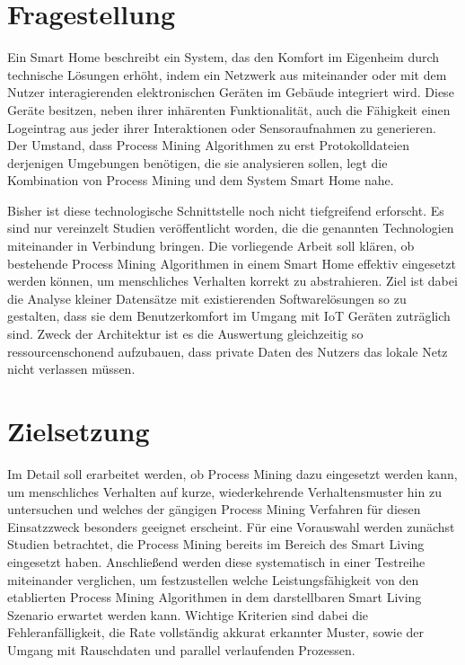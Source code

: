 \section{Fragestellung}
Ein Smart Home beschreibt ein System, das den Komfort im Eigenheim durch technische Lösungen erhöht, indem ein Netzwerk aus miteinander oder mit dem Nutzer interagierenden elektronischen Geräten im Gebäude integriert wird. Diese Geräte besitzen, neben ihrer inhärenten Funktionalität, auch die Fähigkeit einen Logeintrag aus jeder ihrer Interaktionen oder Sensoraufnahmen zu generieren. Der Umstand, dass Process Mining Algorithmen zu erst Protokolldateien derjenigen Umgebungen benötigen, die sie analysieren sollen, legt die Kombination von Process Mining und dem System Smart Home nahe.
 
Bisher ist diese technologische Schnittstelle noch nicht tiefgreifend erforscht. Es sind nur vereinzelt Studien veröffentlicht worden, die die genannten Technologien miteinander in Verbindung bringen. Die vorliegende Arbeit soll klären, ob bestehende Process Mining Algorithmen in einem Smart Home effektiv eingesetzt werden können, um menschliches Verhalten korrekt zu abstrahieren. Ziel ist dabei die Analyse kleiner Datensätze mit existierenden Softwarelösungen so zu gestalten, dass sie dem Benutzerkomfort im Umgang mit IoT Geräten zuträglich sind. Zweck der Architektur ist es die Auswertung gleichzeitig so ressourcenschonend aufzubauen, dass private Daten des Nutzers das lokale Netz nicht verlassen müssen.

\section{Zielsetzung}
Im Detail soll erarbeitet werden, ob Process Mining dazu eingesetzt werden kann, um menschliches Verhalten auf kurze, wiederkehrende Verhaltensmuster hin zu untersuchen und welches der gängigen Process Mining Verfahren für diesen Einsatzzweck besonders geeignet erscheint. Für eine Vorauswahl werden zunächst Studien betrachtet, die Process Mining bereits im Bereich des Smart Living eingesetzt haben. Anschließend werden diese systematisch in einer Testreihe miteinander verglichen, um festzustellen welche Leistungsfähigkeit von den etablierten Process Mining Algorithmen in dem darstellbaren Smart Living Szenario erwartet werden kann. Wichtige Kriterien sind dabei die Fehleranfälligkeit, die Rate vollständig akkurat erkannter Muster, sowie der Umgang mit Rauschdaten und parallel verlaufenden Prozessen.

